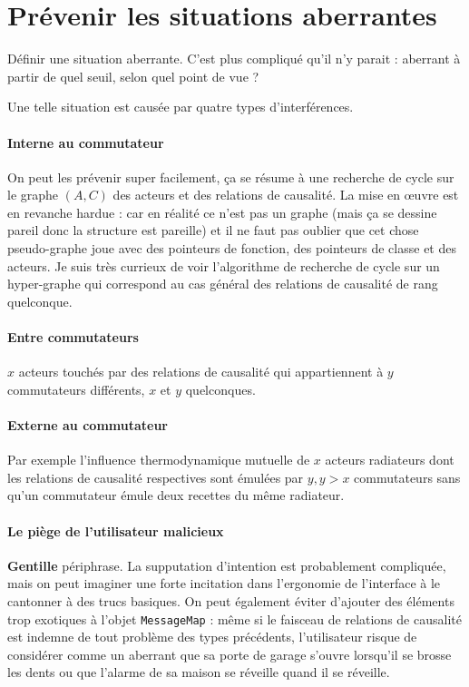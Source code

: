 \documentclass[11pt]{article}
\begin{document}
\section{Prévenir les situations aberrantes}

Définir une situation aberrante. C'est plus compliqué qu'il n'y parait : aberrant à partir de quel seuil, selon quel point de vue ?

Une telle situation est causée par quatre types d'interférences.

\paragraph{Interne au commutateur} On peut les prévenir super facilement, ça se résume à une recherche de cycle sur le graphe $(A, C)$ des acteurs et des relations de causalité. La mise en œuvre est en revanche hardue : car en réalité ce n'est pas un graphe (mais ça se dessine pareil donc la structure est pareille) et il ne faut pas oublier que cet chose pseudo-graphe joue avec des pointeurs de fonction, des pointeurs de classe et des acteurs. Je suis très currieux de voir l'algorithme de recherche de cycle sur un hyper-graphe qui correspond au cas général des relations de causalité de rang quelconque.

\paragraph{Entre commutateurs} $x$ acteurs touchés par des relations de causalité qui appartiennent à $y$ commutateurs différents, $x$ et $y$ quelconques.

\paragraph{Externe au commutateur} Par exemple l'influence thermodynamique mutuelle de $x$ acteurs radiateurs dont les relations de causalité respectives sont émulées par $y, y > x$ commutateurs sans qu'un commutateur émule deux recettes du même radiateur.

\paragraph{Le piège de l'utilisateur malicieux} \textbf{Gentille} périphrase. La supputation d'intention est probablement compliquée, mais on peut imaginer une forte incitation dans l'ergonomie de l'interface à le cantonner à des trucs basiques. On peut également éviter d'ajouter des éléments trop exotiques à l'objet \texttt{MessageMap} : même si le faisceau de relations de causalité est indemne de tout problème des types précédents, l'utilisateur risque de considérer comme un aberrant que sa porte de garage s'ouvre lorsqu'il se brosse les dents ou que l'alarme de sa maison se réveille quand il se réveille.
\end{document}
